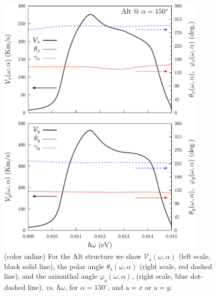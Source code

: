 \documentclass[floatfix,prb,aps,superscriptaddress,showpacs,11pt,preprint,letterpaper]{revtex4}
\def\tama{10cm}
\begin{document}
\begin{figure}[tb]
\centering
\includegraphics[width=\tama]{fig10}
\caption{(color online) For the Alt structure we show
$\mathcal{V}_{\mathrm{a}} (\omega,\alpha)$ (left scale, black solid line), the polar
angle $\theta_{\mathrm{a}} (\omega,\alpha)$ (right scale, red dashed  line), and the
azimuthal angle $\varphi_{\mathrm{a}} (\omega,\alpha)$, (right scale, blue dot-dashed 
line), {\it vs.} $\hbar\omega$, for $\alpha=150^\circ$, and $\mathrm{a}=x$ or
$\mathrm{a}=y$. }
\label{fig:alt-vx-vy-w2}
\end{figure}
\end{document}
